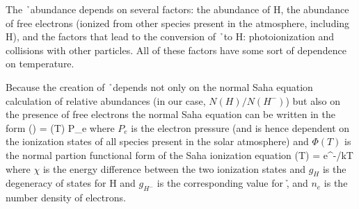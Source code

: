 The \h\ abundance depends on several factors: the abundance of H, the
abundance of free electrons (ionized from other species present in the
atmosphere, including H), and the factors that lead to the conversion
of \h\ to H: photoionization and collisions with other particles.  All
of these factors have some sort of dependence on temperature.


Because the creation of \h\ depends not only on the normal Saha
equation calculation of relative abundances (in our case,
$N(H)/N(H^-)$) but also on the presence of free electrons the normal
Saha equation can be written in the form (\citealt{collins1989})
\beq
{} = \Phi (T) P_e
\eeq
where $P_e$ is the electron pressure (and is hence dependent on the
ionization states of all species present in the solar atmosphere) and
$\Phi (T)$ is the normal partion functional form of the Saha
ionization equation
\beq
\Phi (T) = e^{-\chi/kT}
\eeq
where $\chi$ is the energy difference between the two ionization
states and $g_H$ is the degeneracy of states for H and $g_{H^-}$ is
the corresponding value for \h, and $n_e$ is the number density of electrons.
